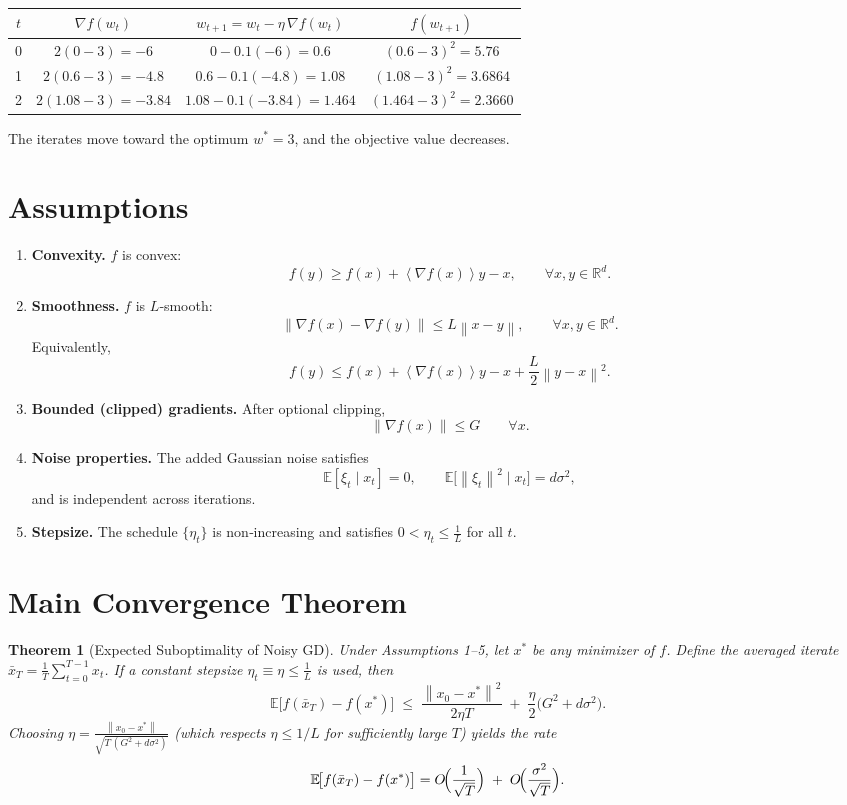 \documentclass[11pt]{article}
\newtheorem{theorem}{Theorem}
\newcommand{\E}{\mathbb{E}}
\newcommand{\R}{\mathbb{R}}
\newcommand{\norm}[1]{\left\lVert #1 \right\rVert}
\newcommand{\inner}[1]{\left\langle #1 \right\rangle}
\begin{document}
\begin{center}
\begin{tabular}{c|c|c|c}
$t$ & $\nabla f(w_{t})$ & $w_{t+1}=w_{t}-\eta\,\nabla f(w_{t})$ & $f(w_{t+1})$\\ \hline
0 & $2(0-3)=-6$ & $0-0.1(-6)=0.6$ & $(0.6-3)^{2}=5.76$\\
1 & $2(0.6-3)=-4.8$ & $0.6-0.1(-4.8)=1.08$ & $(1.08-3)^{2}=3.6864$\\
2 & $2(1.08-3)=-3.84$ & $1.08-0.1(-3.84)=1.464$ & $(1.464-3)^{2}=2.3660$\\
\end{tabular}
\end{center}
The iterates move toward the optimum $w^{*}=3$, and the objective value decreases.

\newpage
\section*{Assumptions}
\begin{enumerate}
    \item \textbf{Convexity.} $f$ is convex:
    \[
    f(y)\ge f(x)+\inner{\nabla f(x)}{y-x},\qquad\forall x,y\in\R^{d}.
    \]
    \item \textbf{Smoothness.} $f$ is $L$‑smooth:
    \[
    \norm{\nabla f(x)-\nabla f(y)}\le L\norm{x-y},\qquad\forall x,y\in\R^{d}.
    \]
    Equivalently,
    \[
    f(y)\le f(x)+\inner{\nabla f(x)}{y-x}+\frac{L}{2}\norm{y-x}^{2}.
    \]
    \item \textbf{Bounded (clipped) gradients.} After optional clipping,
    \[
    \norm{\nabla f(x)}\le G\qquad\forall x.
    \]
    \item \textbf{Noise properties.} The added Gaussian noise satisfies
    \[
    \E[\xi_{t}\mid x_{t}]=0,\qquad 
    \E\!\bigl[\norm{\xi_{t}}^{2}\mid x_{t}\bigr]=d\sigma^{2},
    \]
    and is independent across iterations.
    \item \textbf{Stepsize.} The schedule $\{\eta_{t}\}$ is non‑increasing and satisfies
    $0<\eta_{t}\le \frac{1}{L}$ for all $t$.
\end{enumerate}

\section*{Main Convergence Theorem}
\begin{theorem}[Expected Suboptimality of Noisy GD]\label{thm:conv}
Under Assumptions 1–5, let $x^{*}$ be any minimizer of $f$.
Define the averaged iterate $\bar x_{T}= \frac{1}{T}\sum_{t=0}^{T-1}x_{t}$.
If a constant stepsize $\eta_{t}\equiv\eta\le\frac{1}{L}$ is used, then
\[
\boxed{
\E\!\bigl[f(\bar x_{T})-f(x^{*})\bigr]\;
\le\;
\frac{\norm{x_{0}-x^{*}}^{2}}{2\eta T}
\;+\;
\frac{\eta}{2}\bigl(G^{2}+d\sigma^{2}\bigr).
}
\]
Choosing $\eta = \frac{\norm{x_{0}-x^{*}}}{\sqrt{T\,(G^{2}+d\sigma^{2})}}$ (which respects
$\eta\le 1/L$ for sufficiently large $T$) yields the rate
\[
\E\!\bigl[f(\bar x_{T})-f(x^{*})\bigr]=
O\!\Bigl(\frac{1}{\sqrt{T}}\Bigr)
\;+\;O\!\Bigl(\frac{\sigma^{2}}{\sqrt{T}}\Bigr).
\]
\end{theorem}
\end{document}
